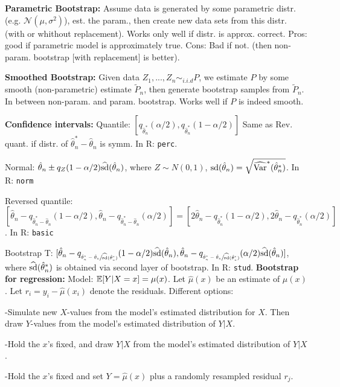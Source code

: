 \textbf{Parametric Bootstrap:}
Assume data is generated by some parametric distr. (e.g. $\mathcal{N}(\mu, \sigma^2)$), est. the param.,
then create new data sets from this distr. (with or whithout replacement). Works only well if distr. is approx. correct.
Pros: good if parametric model is approximately true. Cons: Bad if not. (then non-param. bootstrap [with replacement] is better).

\textbf{Smoothed Bootstrap:}
Given data $Z_1,...,Z_n \sim_{i.i.d} P$, we estimate $P$ by some smooth (non-parametric) estimate $\tilde P_n$, then generate bootstrap samples from $\tilde P_n$. In between non-param. and param. bootstrap. Works well if $P$ is indeed smooth.

\textbf{Confidence intervals:}
Quantile: $[q_{\hat\theta_n^\ast}(\alpha/2), q_{\hat\theta_n^\ast}(1-\alpha/2)]$ Same as Rev. quant. if distr. of $\hat\theta_n^\ast-\hat\theta_n$ is symm. In R: \texttt{perc}.

Normal: $\hat\theta_n \pm q_Z(1-\alpha/2)\widehat{\textup{sd}}(\hat\theta_n)$, where $Z\sim N(0,1)$, $\textup{sd}(\hat\theta_n)=\sqrt{\widehat{\textup{Var}}^\ast(\hat\theta_n^\ast)}$. In R: \texttt{norm}

Reversed quantile: $[\hat\theta_n-q_{\hat\theta_n^\ast-\hat\theta_n}(1-\alpha /2), \hat\theta_n-q_{\hat\theta_n^\ast-\hat\theta_n}(\alpha /2)]=[2\hat\theta_n-q_{\hat\theta_n^\ast}(1-\alpha/2), 2\hat\theta_n-q_{\hat\theta_n^\ast}(\alpha/2)]$. In R: \texttt{basic}

Bootstrap T: $[\hat\theta_n-q_{\sfrac{\hat\theta_n^\ast-\hat\theta_n}{\widehat{\textup{sd}}(\hat\theta_n^\ast)}}(1-\alpha/2)\widehat{\textup{sd}}(\hat\theta_n), \hat\theta_n-q_{\sfrac{\hat\theta_n^\ast-\hat\theta_n}{\widehat{\textup{sd}}(\hat\theta_n^\ast)}}(\alpha/2)\widehat{\textup{sd}}(\hat\theta_n)]$, where $\widehat{\textup{sd}}(\hat\theta_n^\ast)$ is obtained via second layer of bootstrap. In R: \texttt{stud}.
\textbf{Bootstrap for regression:}
Model: $\mathbb{E}[Y|X=x]=\mu(x)$. Let $\hat\mu(x)$ be an estimate of $\mu(x)$. Let $r_i=y_i-\hat\mu(x_i)$ denote the residuals. Different options:

-Simulate new $X$-values from the model's estimated distribution for $X$. Then draw $Y$-values from the model's estimated distribution of $Y|X$.

-Hold the $x$'s fixed, and draw $Y|X$ from the model's estimated distribution of $Y|X$.

-Hold the $x$'s fixed and set $Y=\hat\mu(x)$ plus a randomly resampled residual $r_j$.

